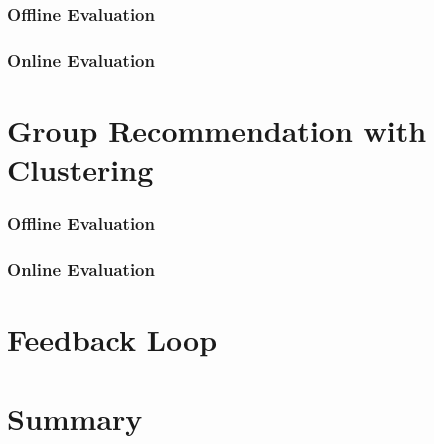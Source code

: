 \subsubsection{Offline Evaluation}

\subsubsection{Online Evaluation}

\section{Group Recommendation with Clustering}

\subsubsection{Offline Evaluation}

\subsubsection{Online Evaluation}


\section{Feedback Loop}\label{section:eval-feedback}


\section{Summary}


